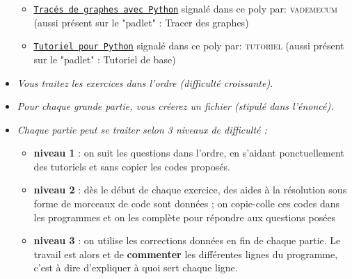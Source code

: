 \documentclass[11pt]{article}
\begin{document}
\begin{itemize}
\begin{itemize}
 \item \href{http://pedagogie.ac-limoges.fr/physique-chimie/IMG/pdf/python-trace_de_graphe.pdf}{\underline{\texttt{Tracés de graphes avec Python}}} signalé dans ce poly par: \textsc{vademecum} (aussi présent sur le "padlet" : Tracer des graphes)

 \medskip
 
 \item \href{http://pedagogie.ac-limoges.fr/physique-chimie/IMG/pdf/python-tutoriel.pdf}{\underline{\texttt{Tutoriel pour Python}}} signalé dans ce poly par: \textsc{tutoriel} (aussi présent sur le "padlet" : Tutoriel de base)
\end{itemize}







\bigskip



\item \textit{Vous traitez les exercices dans l'ordre (difficulté croissante).}




\bigskip






\item \textit{Pour chaque grande partie, vous créerez un fichier (stipulé dans l'énoncé).}







\bigskip






\item \textit{Chaque partie peut se traiter selon 3 niveaux de difficulté :} 

\medskip

\begin{itemize}
 \item \textbf{niveau 1} : on suit les questions dans l'ordre, en s'aidant ponctuellement des tutoriels et sans copier les codes proposés.

 \medskip
 \item \textbf{niveau 2} : dès le début de chaque exercice, des aides à la résolution sous forme de morceaux de code sont données ; on copie-colle ces codes dans les programmes et on les complète pour répondre aux questions posées
 
 \medskip
 \item \textbf{niveau 3} : on utilise les corrections données en fin de chaque partie. Le travail est alors et de \textbf{commenter} les différentes lignes du programme, c'est à dire d'expliquer à quoi sert chaque ligne.
 

\end{itemize}
\end{itemize}
\end{document}
